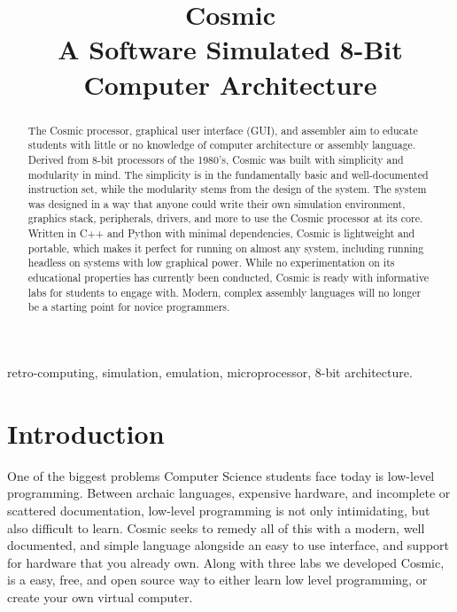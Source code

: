 \documentclass[conference]{IEEEtran}
\begin{document}
\title{Cosmic\\A Software Simulated 8-Bit Computer Architecture}
\author{
\and
{}
}
\maketitle


\begin{abstract}
The Cosmic processor, graphical user interface (GUI), and assembler aim to educate students with little or no knowledge of computer architecture or assembly language. Derived from 8-bit processors of the 1980’s, Cosmic was built with simplicity and modularity in mind. The simplicity is in the fundamentally basic and well-documented instruction set, while the modularity stems from the design of the system. The system was designed in a way that anyone could write their own simulation environment, graphics stack, peripherals, drivers, and more to use the Cosmic processor at its core. Written in C++ and Python with minimal dependencies, Cosmic is lightweight and portable, which makes it perfect for running on almost any system, including running headless on systems with low graphical power. While no experimentation on its educational properties has currently been conducted, Cosmic is ready with informative labs for students to engage with. Modern, complex assembly languages will no longer be a starting point for novice programmers.
\end{abstract}

\begin{IEEEkeywords}
retro-computing, simulation, emulation, microprocessor, 8-bit architecture.
\end{IEEEkeywords}


\section{Introduction}
One of the biggest problems Computer Science students face today is low-level programming. Between archaic languages, expensive hardware, and incomplete or scattered documentation, low-level programming is not only intimidating, but also difficult to learn. Cosmic seeks to remedy all of this with a modern, well documented, and simple language alongside an easy to use interface, and support for hardware that you already own. Along with three labs we developed Cosmic, is a easy, free, and open source way to either learn low level programming, or create your own virtual computer. 
\end{document}
